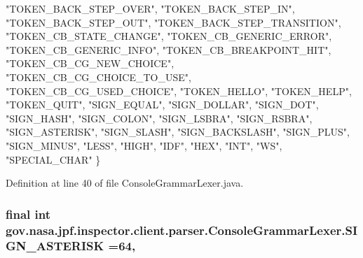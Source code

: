 \begin{DoxyCode}
    \textcolor{stringliteral}{"TOKEN\_BACK\_STEP\_OVER"}, \textcolor{stringliteral}{"TOKEN\_BACK\_STEP\_IN"}, \textcolor{stringliteral}{"TOKEN\_BACK\_STEP\_OUT"}, \textcolor{stringliteral}{"TOKEN\_BACK\_STEP\_TRANSITION"}, 
    \textcolor{stringliteral}{"TOKEN\_CB\_STATE\_CHANGE"}, \textcolor{stringliteral}{"TOKEN\_CB\_GENERIC\_ERROR"}, \textcolor{stringliteral}{"TOKEN\_CB\_GENERIC\_INFO"}, 
    \textcolor{stringliteral}{"TOKEN\_CB\_BREAKPOINT\_HIT"}, \textcolor{stringliteral}{"TOKEN\_CB\_CG\_NEW\_CHOICE"}, \textcolor{stringliteral}{"TOKEN\_CB\_CG\_CHOICE\_TO\_USE"}, 
    \textcolor{stringliteral}{"TOKEN\_CB\_CG\_USED\_CHOICE"}, \textcolor{stringliteral}{"TOKEN\_HELLO"}, \textcolor{stringliteral}{"TOKEN\_HELP"}, \textcolor{stringliteral}{"TOKEN\_QUIT"}, 
    \textcolor{stringliteral}{"SIGN\_EQUAL"}, \textcolor{stringliteral}{"SIGN\_DOLLAR"}, \textcolor{stringliteral}{"SIGN\_DOT"}, \textcolor{stringliteral}{"SIGN\_HASH"}, \textcolor{stringliteral}{"SIGN\_COLON"}, \textcolor{stringliteral}{"SIGN\_LSBRA"}, 
    \textcolor{stringliteral}{"SIGN\_RSBRA"}, \textcolor{stringliteral}{"SIGN\_ASTERISK"}, \textcolor{stringliteral}{"SIGN\_SLASH"}, \textcolor{stringliteral}{"SIGN\_BACKSLASH"}, \textcolor{stringliteral}{"SIGN\_PLUS"}, 
    \textcolor{stringliteral}{"SIGN\_MINUS"}, \textcolor{stringliteral}{"LESS"}, \textcolor{stringliteral}{"HIGH"}, \textcolor{stringliteral}{"IDF"}, \textcolor{stringliteral}{"HEX"}, \textcolor{stringliteral}{"INT"}, \textcolor{stringliteral}{"WS"}, \textcolor{stringliteral}{"SPECIAL\_CHAR"}
  \}
\end{DoxyCode}


Definition at line 40 of file Console\+Grammar\+Lexer.\+java.

\subsubsection[{\texorpdfstring{S\+I\+G\+N\+\_\+\+A\+S\+T\+E\+R\+I\+SK}{SIGN_ASTERISK}}]{\setlength{\rightskip}{0pt plus 5cm}final int gov.\+nasa.\+jpf.\+inspector.\+client.\+parser.\+Console\+Grammar\+Lexer.\+S\+I\+G\+N\+\_\+\+A\+S\+T\+E\+R\+I\+SK =64\hspace{0.3cm}{\ttfamily [static]}, {\ttfamily [package]}}\hypertarget{classgov_1_1nasa_1_1jpf_1_1inspector_1_1client_1_1parser_1_1_console_grammar_lexer_a408c4a1df46f51c4b0849ab4cfa165ba}{}\label{classgov_1_1nasa_1_1jpf_1_1inspector_1_1client_1_1parser_1_1_console_grammar_lexer_a408c4a1df46f51c4b0849ab4cfa165ba}


